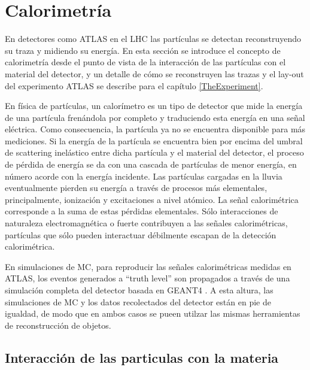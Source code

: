 
\section{Calorimetría}

En detectores como ATLAS en el LHC las partículas se detectan reconstruyendo su traza y midiendo su energía. En esta sección se introduce el concepto de calorimetría desde el punto de vista de la interacción de las partículas con el material del detector, y un detalle de cómo se reconstruyen las trazas y el lay-out del experimento ATLAS se describe para el capítulo \ref{TheExperiment}.

En física de partículas, un calorímetro es un tipo de detector que mide la energía de una partícula frenándola por completo y traduciendo esta energía en una señal eléctrica. Como consecuencia, la partícula ya no se encuentra disponible para más mediciones. Si la energía de la partícula se encuentra bien por encima del umbral de scattering inelástico entre dicha partícula y el material del detector, el proceso de pérdida de energía se da con una cascada de partículas de menor energía, en número acorde con la energía incidente. Las partículas cargadas en la lluvia eventualmente pierden su energía a través de procesos más elementales, principalmente, ionización y excitaciones a nivel atómico. La señal calorimétrica corresponde a la suma de estas pérdidas elementales. Sólo interacciones de naturaleza electromagnética o fuerte contribuyen a las señales calorimétricas, partículas que sólo pueden interactuar débilmente escapan de la detección calorimétrica.

En simulaciones de MC, para reproducir las señales calorimétricas medidas en ATLAS, los eventos generados a ``truth level'' son propagados a través de una simulación completa del detector basada en GEANT4 \cite{AtlasSimulation}. A esta altura, las simulaciones de MC y los datos recolectados del detector están en pie de igualdad, de modo que en ambos casos se pueen utilzar las mismas herramientas de reconstrucción de objetos.

\subsection{Interacción de las particulas con la materia}


